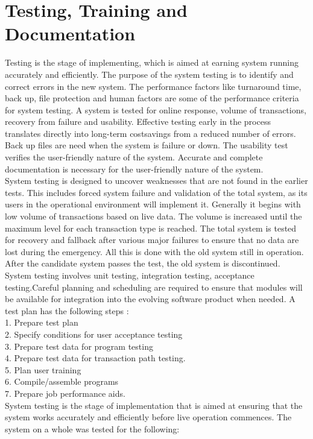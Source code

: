 \section{ Testing, Training and Documentation}
Testing is the stage of implementing, which is aimed at earning system running accurately and efficiently. The purpose of the system testing is to identify and correct errors in the new system. The performance factors like turnaround time, back up, file protection and human factors are some of the performance criteria for system testing. A system is tested for online response, volume of transactions, recovery from failure and usability.
Effective testing early in the process translates directly into long-term costsavings from a reduced number of errors. Back up files are need when the system is failure or down. The usability test verifies the user-friendly nature of the system. Accurate and complete documentation is necessary for the user-friendly nature of the system.\\
System testing is designed to uncover weaknesses that are not found in the earlier tests. This includes forced system failure and validation of the total system, as its users in the operational environment will implement it. Generally it begins with low volume of transactions based on live data. The volume is increased until the maximum level for each transaction type is reached. The total system is tested for recovery and fallback after various major failures to ensure that no data are lost during the emergency. All this is done with the old system still in operation. After the candidate system passes the test, the old system is discontinued.\\
System testing involves unit testing, integration testing, acceptance testing.Careful planning and scheduling are required to ensure that modules will be available for integration into the evolving software product when needed. A test plan has the following steps :\\
1. Prepare test plan\\
2. Specify conditions for user acceptance testing\\
3. Prepare test data for program testing\\
4. Prepare test data for transaction path testing.\\
5. Plan user training\\
6. Compile/assemble programs\\
7. Prepare job performance aids.\\
System testing is the stage of implementation that is aimed at ensuring that the system works accurately and efficiently before live operation commences. The system on a whole was tested for the following:\\
